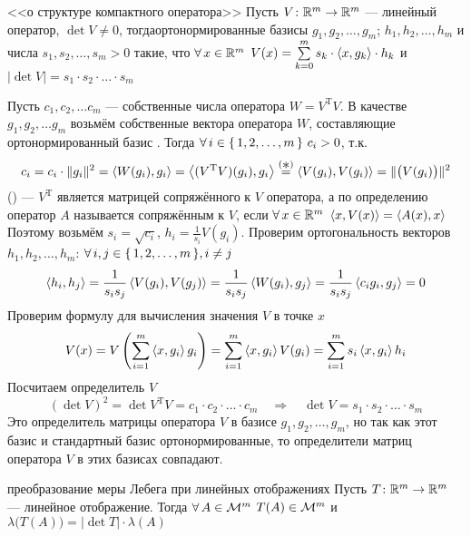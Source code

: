 \begin{lem}[https://www.youtube.com/live/Y10gq1j3ADI?si=-pbDvy1lH1-gYVgV&t=9992]{<<о структуре компактного оператора>>}\label{стр.комп.опер.}%
	Пусть $V \colon \mathbb R^m \to \mathbb R^m$ --- линейный оператор, $\det V \ne 0$, тогда\E ортонормированные базисы $g_1, g_2, \ldots, g_m$; $h_1, h_2, \ldots, h_m$ и числа $s_1, s_2, \ldots, s_m > 0$ такие, что $\forall \, x \in \mathbb R^m$ $V(x) = \sum\limits_{k = 0}^{m} s_k \cdot \left<x, g_k\right> \cdot h_k$ и $|\det V| = s_1 \cdot s_2 \cdot \ldots \cdot s_m$ 
\end{lem}

\begin{prf}
	Пусть $c_1, c_2, \ldots c_m$ --- собственные числа оператора $W = V^{\mathrm T}V$. В качестве $g_1, g_2, \ldots g_m$ возьмём собственные вектора оператора $W$, составляющие ортонормированный базис \rmm. Тогда $\forall \, i \in \{\,1, 2, \ldots, m\,\}\ c_i >0$, т.к.
	\[c_i = c_i \cdot \|g_i\|^2 = \scal{W(g_i), g_i} = \scal{(V^\mathrm T V)(g_i), g_i} \stackrel{(\raisebox{-1.5pt}{\large\textasteriskcentered})}{=} \scal{V(g_i), V(g_i)} = \|\bigl(V(g_i)\bigr)\|^2\]
	(\raisebox{-1pt}{\Large\textasteriskcentered}) --- $V^{\mathrm T}$ является матрицей сопряжённого к $V$ оператора, а по определению оператор $A$ называется сопряжённым к $V$, если $\forall \, x \in \mathbb R^m$ $\left<x, V(x)\right> = \left<A(x), x\right>$
	\\[5pt]
	Поэтому возьмём $s_i = \sqrt{c_i}$, $h_i = \frac {1}{s_i} V(g_i)$. Проверим ортогональность векторов $h_1, h_2, \ldots, h_m$: $\forall \, i, j \in \{\,1, 2, \ldots, m\,\}, i \ne j$
	\[\left<h_i, h_j\right> = \frac{1}{s_i s_j} \left<V(g_i), V(g_j)\right> = \frac{1}{s_i s_j} \left<W(g_i), g_j\right> = \frac{1}{s_i s_j} \left<c_i g_i, g_j\right> = 0\]
	Проверим формулу для вычисления значения $V$ в точке $x$
	\[V(x) = V\left(\sum_{i = 1}^m \left<x, g_i\right> g_i\right) = \sum_{i = 1}^m \left<x, g_i\right> V(g_i) = \sum_{i = 1}^m s_i \left<x, g_i\right> h_i\]
	Посчитаем определитель $V$
	\[(\det V)^2 = \det V^\mathrm T V = c_1 \cdot c_2 \cdot \ldots \cdot c_m \quad \Rightarrow \quad \det V = s_1 \cdot s_2 \cdot \ldots \cdot s_m\]
	Это определитель матрицы оператора $V$ в базисе $g_1, g_2, \ldots, g_m$, но так как этот базис и стандартный базис ортонормированные, то определители матриц оператора $V$ в этих базисах совпадают. 
\end{prf}

\begin{teor}{преобразование меры Лебега при линейных отображениях}
	Пусть $T \colon \mathbb R^m \to \mathbb R^m$ --- линейное отображение. Тогда $\forall \, A \in \mathcal{M}^m$ $T(A) \in \mathcal{M}^m$ и $\lambda\bigl(T(A)\bigr) = |\det T| \cdot \lambda(A)$
\end{teor}

